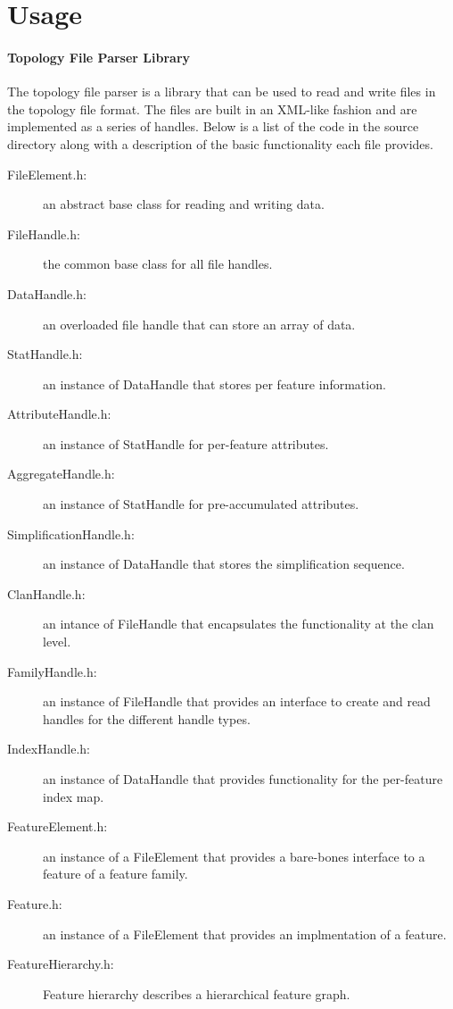 \section{Usage} \label{sec:usage}

\paragraph{Topology File Parser Library} 
The topology file parser is a library that can be used to read and write files in the topology file format.  The 
files are built in an XML-like fashion and are implemented as a series of handles.  Below is a list of
the code in the source directory along with a description of the basic functionality each file provides. 
\begin{description}
\item[FileElement.h:] an abstract base class for reading and writing data.
\item[FileHandle.h:] the common base class for all file handles.
\item[DataHandle.h:] an overloaded file handle that can store an array of data.
\item[StatHandle.h:] an instance of DataHandle that stores per feature information.
\item[AttributeHandle.h:] an instance of StatHandle for per-feature attributes.
\item[AggregateHandle.h:] an instance of StatHandle for pre-accumulated attributes.
\item[SimplificationHandle.h:] an instance of DataHandle that stores the simplification sequence.
\item[ClanHandle.h:] an intance of FileHandle that encapsulates the functionality at the clan level. 
\item[FamilyHandle.h:] an instance of FileHandle that provides an interface to create and read handles for the different handle types.
\item[IndexHandle.h:] an instance of DataHandle that provides functionality for the per-feature index map.
\item[FeatureElement.h:] an instance of a FileElement that provides a bare-bones interface to a feature of a feature family.
\item[Feature.h:] an instance of a FileElement that provides an implmentation of a feature.
\item[FeatureHierarchy.h:] Feature hierarchy describes a hierarchical feature graph.
\end{description}

